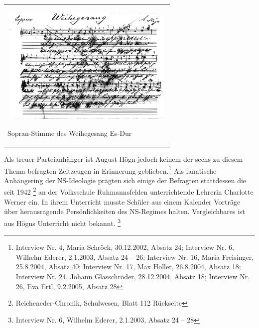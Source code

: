\begin{center}
\begin{minipage}{8.835cm}
\begin{center}
\tablefirsthead{}
\tablehead{}
\tabletail{}
\tablelasttail{}
\begin{supertabular}{m{8.635cm}}

\includegraphics[width=8.453cm,height=5.678cm]{pictures/zulassungsarbeit-img035.png}

Sopran-Stimme des Weihegesang Es-Dur\\
\end{supertabular}
\end{center}
\end{minipage}
\end{center}
Als treuer Parteianhänger ist August Högn jedoch keinem der sechs zu
diesem Thema befragten Zeitzeugen in Erinnerung geblieben.\footnote{
Interview Nr. 4, Maria Schröck, 30.12.2002, Absatz 24; Interview Nr. 6,
Wilhelm Ederer, 2.1.2003, Absatz 24 – 26; Interview Nr. 16, Maria
Freisinger, 25.8.2004, Absatz 40; Interview Nr. 17, Max Holler,
26.8.2004, Absatz 18; Interview Nr. 24, Johann Glasschröder,
28.12.2004, Absatz 18; Interview Nr. 26, Eva Ertl, 9.2.2005, Absatz 28}
Als fanatische Anhängering der NS-Ideologie prägten sich einige der
Befragten stattdessen die seit 1942 \footnote{Reicheneder-Chronik,
Schulwesen, Blatt 112 Rückseite} an der Volksschule Ruhmannsfelden
unterrichtende Lehrerin Charlotte Werner ein. In ihrem Unterricht
musste Schüler aus einem Kalender Vorträge über herausragende
Persönlichkeiten des NS-Regimes halten. Vergleichbares ist aus Högns
Unterricht nicht bekannt. \footnote{Interview Nr. 6, Wilhelm Ederer,
2.1.2003, Absatz 24 – 28}

